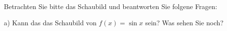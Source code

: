 \begin{aufgabe}
Betrachten Sie bitte das Schaubild und beantworten Sie folgene Fragen:

\begin{multicols}{2}
\begin{teilaufgaben}{a)}
\teilaufgabe Kann das das Schaubild von $f(x) = \sin x$ sein?
\teilaufgabe Was sehen Sie noch?
\end{teilaufgaben}
\end{multicols}
\end{aufgabe}